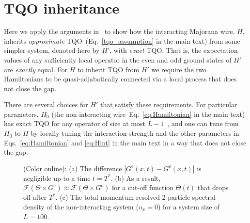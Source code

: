 \documentclass[aps,pra,floatfix,footinbib,longbibliography,twocolumn,superscriptaddress, preprintnumbers, nobibnotes]{revtex4-1}
\begin{document}
\section{TQO inheritance}\label{app:TQOinher}

Here we apply the arguments in~\cite{Hastings2005} to show how the interacting Majorana wire, $H$, inherits \emph{approximate} TQO~(Eq.~\ref{tqo_assumption} in the main text) from some simpler system, denoted here by $H'$, with \emph{exact} TQO.  That is, the expectation values of any sufficiently local operator in the even and odd ground states of $H'$ are \emph{exactly} equal. For $H$ to inherit TQO from $H'$ we require the two Hamiltonians to be quasi-adiabatically connected via a local process that does not close the gap.

There are several choices for $H'$ that satisfy these requirements. For particular parameters, $H_0$ (the non-interacting wire~Eq.~\ref{eq:Hamiltonian} in the main text) has exact TQO for any operator of size at most $L-1$~\cite{Kitaev2001}, and one can tune from $H_0$ to $H$ by locally tuning the interaction strength and the other parameters in Eqs.~\ref{eq:Hamiltonian} and \ref{eq:Hint} in the main text in a way that does not close the gap. 

\begin{figure*}
\centering
{}
\caption[]{(Color online): (a) The difference $|G^e(x,t) -G^o(x,t)|$ is negligible up to a time $t=T^{*}$. (b) As a result, $ \mathcal{F}(\Theta \times G^e)\approx \mathcal{F}(\Theta \times G^o)$ for a cut-off function $\Theta(t)$ that drops off after $T^*$. (c) The total momentum resolved 2-particle spectral density of the non-interacting system ($u_x=0$) for a system size of $L=100$.}
\label{fig:TP_spectral}
\end{figure*}
\end{document}
